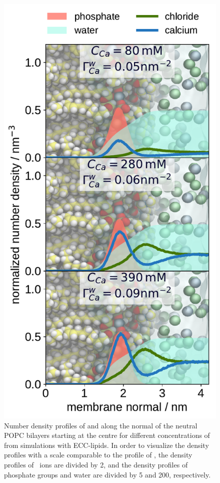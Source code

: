 \begin{figure}[htbp!] 
  \centering 
  \includegraphics[width=\figwidth]{../img/ecc_popc/density_profiles_ca_cl_wat_phos_concentrations-compar.pdf} 
  \caption{\label{fig:cacl-dens} 
    Number density profiles of  and  along the normal of the neutral POPC bilayers starting at the centre 
    for different concentrations of  from simulations with ECC-lipids. 
    In order to visualize the density profiles with a scale comparable to the profile of ,  
    the density profiles of~ ions are divided by 2, and 
    the density profiles of phosphate groups and water are divided by 5 and 200, respectively.  
    } 
\end{figure} 


